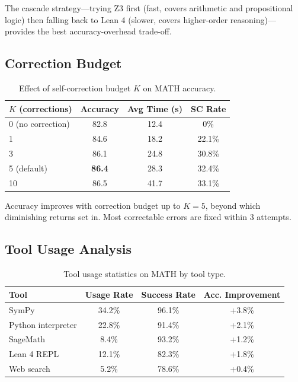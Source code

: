\documentclass[11pt,a4paper]{article}
\begin{document}
The cascade strategy---trying Z3 first (fast, covers arithmetic and propositional logic) then falling back to Lean 4 (slower, covers higher-order reasoning)---provides the best accuracy-overhead trade-off.

\subsection{Correction Budget}

\begin{table}[t]
\centering
\caption{Effect of self-correction budget $K$ on MATH accuracy.}
\label{tab:correction_budget}
\begin{tabular}{lccc}
\toprule
\textbf{$K$ (corrections)} & \textbf{Accuracy} & \textbf{Avg Time (s)} & \textbf{SC Rate} \\
\midrule
0 (no correction) & 82.8 & 12.4 & 0\% \\
1 & 84.6 & 18.2 & 22.1\% \\
3 & 86.1 & 24.8 & 30.8\% \\
5 (default) & \textbf{86.4} & 28.3 & 32.4\% \\
10 & 86.5 & 41.7 & 33.1\% \\
\bottomrule
\end{tabular}
\end{table}

Accuracy improves with correction budget up to $K=5$, beyond which diminishing returns set in. Most correctable errors are fixed within 3 attempts.

\subsection{Tool Usage Analysis}

\begin{table}[t]
\centering
\caption{Tool usage statistics on MATH by tool type.}
\label{tab:tool_usage}
\begin{tabular}{lccc}
\toprule
\textbf{Tool} & \textbf{Usage Rate} & \textbf{Success Rate} & \textbf{Acc. Improvement} \\
\midrule
SymPy & 34.2\% & 96.1\% & +3.8\% \\
Python interpreter & 22.8\% & 91.4\% & +2.1\% \\
SageMath & 8.4\% & 93.2\% & +1.2\% \\
Lean 4 REPL & 12.1\% & 82.3\% & +1.8\% \\
Web search & 5.2\% & 78.6\% & +0.4\% \\
\bottomrule
\end{tabular}
\end{table}
\end{document}
